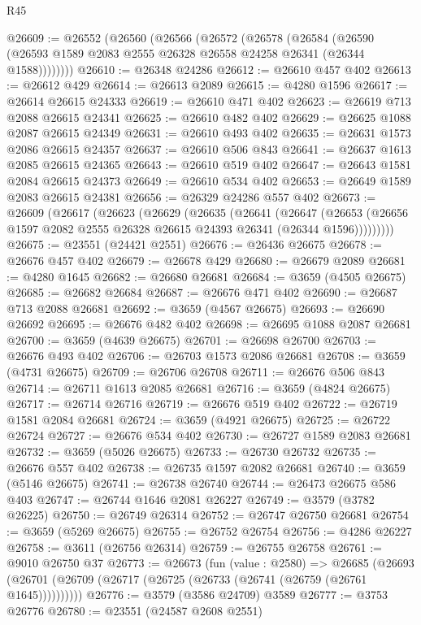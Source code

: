 \begin{lexlean}{R45}
\begin{coremodule}
@26609 := @26552
    (@26560
      (@26566
        (@26572
          (@26578
            (@26584
              (@26590 (@26593 @1589 @2083 @2555 @26328 @26558 @24258 @26341 (@26344 @1588))))))))
@26610 := @26348 @24286
@26612 := @26610 @457 @402
@26613 := @26612 @429
@26614 := @26613 @2089
@26615 := @4280 @1596
@26617 := @26614 @26615 @24333
@26619 := @26610 @471 @402
@26623 := @26619 @713 @2088 @26615 @24341
@26625 := @26610 @482 @402
@26629 := @26625 @1088 @2087 @26615 @24349
@26631 := @26610 @493 @402
@26635 := @26631 @1573 @2086 @26615 @24357
@26637 := @26610 @506 @843
@26641 := @26637 @1613 @2085 @26615 @24365
@26643 := @26610 @519 @402
@26647 := @26643 @1581 @2084 @26615 @24373
@26649 := @26610 @534 @402
@26653 := @26649 @1589 @2083 @26615 @24381
@26656 := @26329 @24286 @557 @402
@26673 := @26609
    (@26617
      (@26623
        (@26629
          (@26635
            (@26641
              (@26647
                (@26653 (@26656 @1597 @2082 @2555 @26328 @26615 @24393 @26341 (@26344 @1596)))))))))
@26675 := @23551 (@24421 @2551)
@26676 := @26436 @26675
@26678 := @26676 @457 @402
@26679 := @26678 @429
@26680 := @26679 @2089
@26681 := @4280 @1645
@26682 := @26680 @26681
@26684 := @3659 (@4505 @26675)
@26685 := @26682 @26684
@26687 := @26676 @471 @402
@26690 := @26687 @713 @2088 @26681
@26692 := @3659 (@4567 @26675)
@26693 := @26690 @26692
@26695 := @26676 @482 @402
@26698 := @26695 @1088 @2087 @26681
@26700 := @3659 (@4639 @26675)
@26701 := @26698 @26700
@26703 := @26676 @493 @402
@26706 := @26703 @1573 @2086 @26681
@26708 := @3659 (@4731 @26675)
@26709 := @26706 @26708
@26711 := @26676 @506 @843
@26714 := @26711 @1613 @2085 @26681
@26716 := @3659 (@4824 @26675)
@26717 := @26714 @26716
@26719 := @26676 @519 @402
@26722 := @26719 @1581 @2084 @26681
@26724 := @3659 (@4921 @26675)
@26725 := @26722 @26724
@26727 := @26676 @534 @402
@26730 := @26727 @1589 @2083 @26681
@26732 := @3659 (@5026 @26675)
@26733 := @26730 @26732
@26735 := @26676 @557 @402
@26738 := @26735 @1597 @2082 @26681
@26740 := @3659 (@5146 @26675)
@26741 := @26738 @26740
@26744 := @26473 @26675 @586 @403
@26747 := @26744 @1646 @2081 @26227
@26749 := @3579 (@3782 @26225)
@26750 := @26749 @26314
@26752 := @26747 @26750 @26681
@26754 := @3659 (@5269 @26675)
@26755 := @26752 @26754
@26756 := @4286 @26227
@26758 := @3611 (@26756 @26314)
@26759 := @26755 @26758
@26761 := @9010 @26750 @37
@26773 := @26673
    (fun (value : @2580) =>
    @26685 (@26693 (@26701 (@26709 (@26717 (@26725 (@26733 (@26741 (@26759 (@26761 @1645))))))))))
@26776 := @3579 (@3586 @24709) @3589
@26777 := @3753 @26776
@26780 := @23551 (@24587 @2608 @2551)

\end{coremodule}
\end{lexlean}
